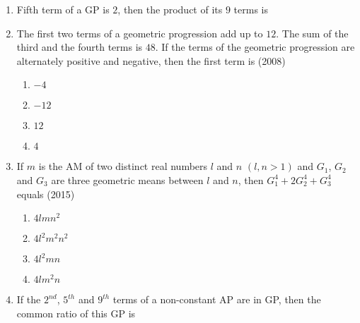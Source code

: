 \begin{enumerate}[label=\thesubsection.\arabic*,ref=\thesubsection.\theenumi]
	{\hfill{}} 
\begin{enumerate}
\end{enumerate}
\item {Fifth term of a GP is $2$, then the product of its $9$ terms is}
{\hfill{}}
\begin{enumerate}	
\end{enumerate}
    \item  The first two terms of a geometric progression add up to $12$. The sum of the third and the fourth terms is $48$. If the terms of the geometric progression are alternately positive and negative,  then the first term is   
    \hfill(2008)
%    
    \begin{multicols}{4}
\begin{enumerate}    
    \item$-4$
    \item$-12$
    \item$12$ 
    \item$4$ 
    \end{enumerate}
\end{multicols}
    \item If $m$ is the AM of two distinct real numbers $l$ and $n$ $(l, n>1)$ and $G_1$,  $G_2$ and $G_3$ are three geometric means between $l$ and $n$,  then $G_1^4+2G_2^4+G_3^4$ equals 
%    
    \hfill(2015)
    \begin{multicols}{4}
\begin{enumerate}    
    \item$4lmn^2$
    \item$4l^2m^2n^2$
    \item$4l^2mn$
    \item$4lm^2n$ 
    \end{enumerate}
\end{multicols}
%
    \item If the $2^{nd}$,  $5^{th}$ and $9^{th}$ terms of a non-constant AP are in GP,  then the common ratio of this GP is

\end{enumerate}
